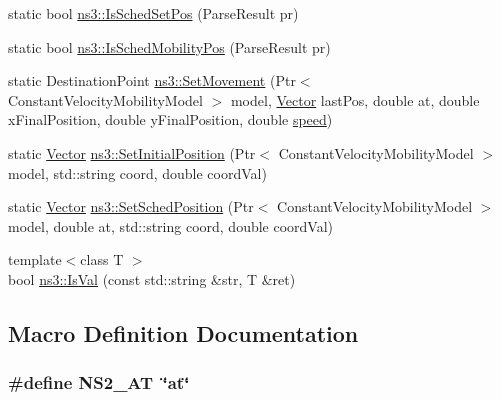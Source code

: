 \begin{DoxyCompactItemize}
static bool \hyperlink{namespacens3_ae70eba6d6fbf3bb4fa349cc82df28f57}{ns3\+::\+Is\+Sched\+Set\+Pos} (Parse\+Result pr)
\item 
static bool \hyperlink{namespacens3_a1ccf8bc01e3dea4e713a6bddb9ef6e0e}{ns3\+::\+Is\+Sched\+Mobility\+Pos} (Parse\+Result pr)
\item 
static Destination\+Point \hyperlink{namespacens3_acdd6ecb3571f04192019c1afc1b935bd}{ns3\+::\+Set\+Movement} (Ptr$<$ Constant\+Velocity\+Mobility\+Model $>$ model, \hyperlink{classns3_1_1Vector3D_a7e59b47bc94c9cb1dadff68c1d0112d8}{Vector} last\+Pos, double at, double x\+Final\+Position, double y\+Final\+Position, double \hyperlink{mmwave-amc-test_8cc_a6dc6e6f3c75c509ce943163afb5dade7}{speed})
\item 
static \hyperlink{classns3_1_1Vector3D_a7e59b47bc94c9cb1dadff68c1d0112d8}{Vector} \hyperlink{namespacens3_ac0a281186f351b540a57372d4124032c}{ns3\+::\+Set\+Initial\+Position} (Ptr$<$ Constant\+Velocity\+Mobility\+Model $>$ model, std\+::string coord, double coord\+Val)
\item 
static \hyperlink{classns3_1_1Vector3D_a7e59b47bc94c9cb1dadff68c1d0112d8}{Vector} \hyperlink{namespacens3_ad0171060956d13fe6e048a14e04daea4}{ns3\+::\+Set\+Sched\+Position} (Ptr$<$ Constant\+Velocity\+Mobility\+Model $>$ model, double at, std\+::string coord, double coord\+Val)
\item 
{\footnotesize template$<$class T $>$ }\\bool \hyperlink{namespacens3_ad50ff479c13d44a670a456ccceffb4d0}{ns3\+::\+Is\+Val} (const std\+::string \&str, T \&ret)
\end{DoxyCompactItemize}


\subsection{Macro Definition Documentation}
\subsubsection[{\texorpdfstring{N\+S2\+\_\+\+AT}{NS2_AT}}]{\setlength{\rightskip}{0pt plus 5cm}\#define N\+S2\+\_\+\+AT~\char`\"{}at\char`\"{}}\hypertarget{ns2-mobility-helper_8cc_a18c3ed1fd6f7c274962671fa9e1d6c6b}{}\label{ns2-mobility-helper_8cc_a18c3ed1fd6f7c274962671fa9e1d6c6b}
